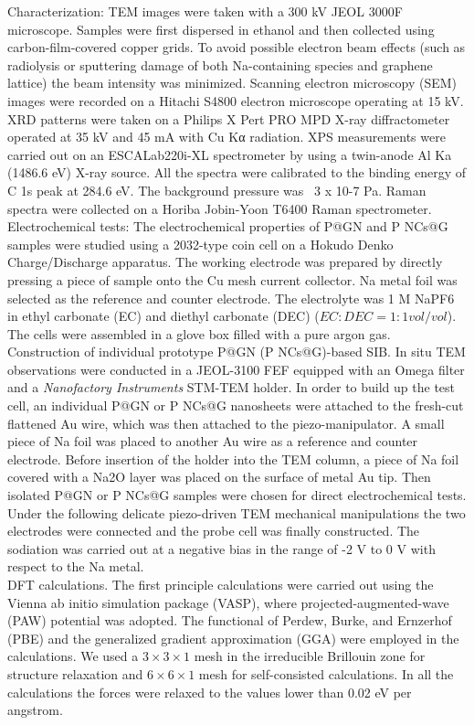 Characterization: TEM images were taken with a 300 kV JEOL 3000F microscope. Samples were first dispersed in ethanol and then collected using carbon-film-covered copper grids. To avoid possible electron beam effects (such as radiolysis or sputtering damage of both Na-containing species and graphene lattice) the beam intensity was minimized. Scanning electron microscopy (SEM) images were recorded on a Hitachi S4800 electron microscope operating at 15 kV. XRD patterns were taken on a Philips X Pert PRO MPD X-ray diffractometer operated at 35 kV and 45 mA with Cu Kα radiation. XPS measurements were carried out on an ESCALab220i-XL spectrometer by using a twin-anode Al Ka (1486.6 eV) X-ray source. All the spectra were calibrated to the binding energy of C 1s peak at 284.6 eV. The background pressure was ~3 x 10-7 Pa. Raman spectra were collected on a Horiba Jobin-Yoon T6400 Raman spectrometer.\\
Electrochemical tests: The electrochemical properties of P@GN and P NCs@G samples were studied using a 2032-type coin cell on a Hokudo Denko Charge/Discharge apparatus. The working electrode was prepared by directly pressing a piece of sample onto the Cu mesh current collector. Na metal foil was selected as the reference and counter electrode. The electrolyte was 1 M NaPF6 in ethyl carbonate (EC) and diethyl carbonate (DEC) ($EC : DEC = 1 : 1 vol/vol$). The cells were assembled in a glove box filled with a pure argon gas.\\ 
Construction of individual prototype P@GN (P NCs@G)-based SIB. In situ TEM observations were conducted in a JEOL-3100 FEF equipped with an Omega filter and a {\em Nanofactory Instruments} STM-TEM holder. In order to build up the test cell, an individual P@GN or P NCs@G nanosheets were attached to the fresh-cut flattened Au wire, which was then attached to the piezo-manipulator. A small piece of Na foil was placed to another Au wire as a reference and counter electrode. Before insertion of the holder into the TEM column, a piece of Na foil covered with a Na2O layer was placed on the surface of metal Au tip. Then isolated P@GN or P NCs@G samples were chosen for direct electrochemical tests. Under the following delicate piezo-driven TEM mechanical manipulations the two electrodes were connected and the probe cell was finally constructed. The sodiation was carried out at a negative bias in the range of -2 V to 0 V with respect to the Na metal.\\
DFT calculations. The first principle calculations were carried out using the Vienna ab initio simulation package (VASP),\cite{Kresse1996} where projected-augmented-wave (PAW) potential was adopted.\cite{Kresse1999} The functional of Perdew, Burke, and Ernzerhof (PBE) and the generalized gradient approximation (GGA)\cite{Perdew1996} were employed in the calculations. We used a $3\times3\times1$ mesh in the irreducible Brillouin zone for structure relaxation and $6\times6\times1$ mesh for self-consisted calculations. In all the calculations the forces were relaxed to the values lower than 0.02 eV per angstrom.

